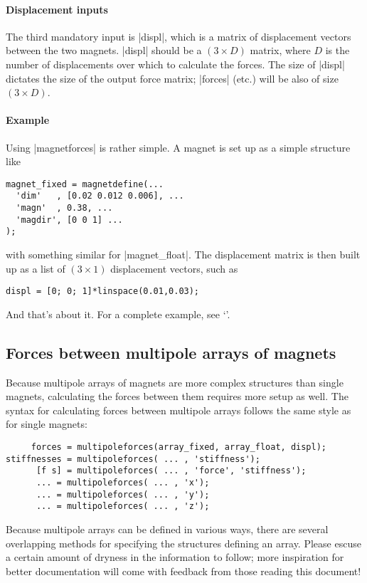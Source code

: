 \documentclass{article}
\begin{document}
\paragraph{Displacement inputs}

The third mandatory input is |displ|, which is a matrix of displacement vectors between the two magnets. |displ| should be a $(3\times D)$ matrix,
where $D$ is the number of displacements over which to calculate the forces.
The size of |displ| dictates the size of the output force matrix; |forces| (etc.) will be also of size $(3\times D)$.

\paragraph{Example} Using |magnetforces| is rather simple. A magnet is set up
as a simple structure like
\begin{verbatim}
magnet_fixed = magnetdefine(...
  'dim'   , [0.02 0.012 0.006], ...
  'magn'  , 0.38, ...
  'magdir', [0 0 1] ...
);
\end{verbatim}
with something similar for |magnet_float|. The displacement matrix is then
built up as a list of $(3\times1)$ displacement vectors, such as
\begin{verbatim}
displ = [0; 0; 1]*linspace(0.01,0.03);
\end{verbatim}
And that's about it.
For a complete example, see `'.


\subsection{Forces between multipole arrays of magnets}

Because multipole arrays of magnets are more complex structures than single magnets, calculating the forces between them requires more setup as well.
The syntax for calculating forces between multipole arrays follows the same style as for single magnets:

\begin{verbatim}
     forces = multipoleforces(array_fixed, array_float, displ);
stiffnesses = multipoleforces( ... , 'stiffness');
      [f s] = multipoleforces( ... , 'force', 'stiffness');
      ... = multipoleforces( ... , 'x');
      ... = multipoleforces( ... , 'y');
      ... = multipoleforces( ... , 'z');
\end{verbatim}

Because multipole arrays can be defined in various ways, there are several
overlapping methods for specifying the structures defining an array. Please escuse a certain amount of dryness in the information to follow; more inspiration for better documentation will come with feedback from those reading this document!
\end{document}
